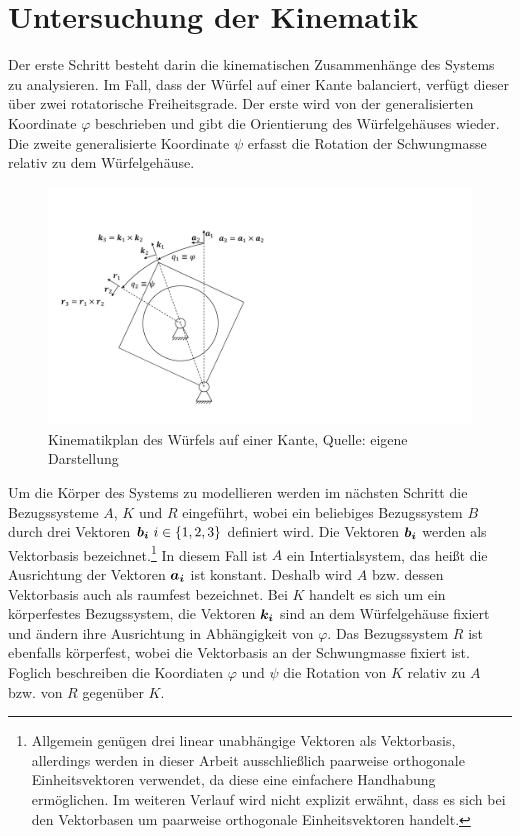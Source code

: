 \section{Untersuchung der Kinematik}
Der erste Schritt besteht darin die kinematischen Zusammenhänge des Systems zu analysieren. Im Fall, dass der Würfel auf einer Kante balanciert, verfügt dieser über zwei rotatorische Freiheitsgrade. Der erste wird von der generalisierten Koordinate $\varphi$ beschrieben und gibt die Orientierung des Würfelgehäuses wieder. Die zweite generalisierte Koordinate $\psi$ erfasst die Rotation der Schwungmasse relativ zu dem Würfelgehäuse.
\begin{figure}[!ht]
\centering
\includegraphics[width=0.6\linewidth, trim={1cm 1.5cm 18cm 3.5cm}, clip]{img/ModellWuerfelseite}
\caption{Kinematikplan des Würfels auf einer Kante, Quelle: eigene Darstellung}
\label{skizze_dynamik_edge}
\end{figure}

Um die Körper des Systems zu modellieren werden im nächsten Schritt die Bezugssysteme $A$, $K$ und $R$ eingeführt, wobei ein beliebiges Bezugssystem $B$ durch drei Vektoren $\boldsymbol{b_i} \ i \in \{1,2,3\}$ definiert wird. Die Vektoren $\boldsymbol{b_i}$ werden als Vektorbasis bezeichnet.\footnote{Allgemein genügen drei linear unabhängige Vektoren als Vektorbasis, allerdings werden in dieser Arbeit ausschließlich paarweise orthogonale Einheitsvektoren verwendet, da diese eine einfachere Handhabung ermöglichen. Im weiteren Verlauf wird nicht explizit erwähnt, dass es sich bei den Vektorbasen um paarweise orthogonale Einheitsvektoren handelt.} In diesem Fall ist $A$ ein Intertialsystem, das heißt die Ausrichtung der Vektoren $\boldsymbol{a_i}$ ist konstant. Deshalb wird $A$ bzw. dessen Vektorbasis auch als raumfest bezeichnet. Bei $K$ handelt es sich um ein körperfestes Bezugssystem, die Vektoren $\boldsymbol{k_i}$ sind an dem Würfelgehäuse fixiert und ändern ihre Ausrichtung in Abhängigkeit von $\varphi$. Das Bezugssystem $R$ ist ebenfalls körperfest, wobei die Vektorbasis an der Schwungmasse fixiert ist. Foglich beschreiben die Koordiaten $\varphi$ und $\psi$ die Rotation von $K$ relativ zu $A$ bzw. von $R$ gegenüber $K$. 

